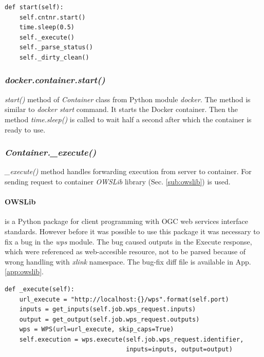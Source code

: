 


\begin{lstlisting}[basicstyle=\small,caption={\textit{Container.create()} method},label={lst:Container_start}]
def start(self):
    self.cntnr.start()
    time.sleep(0.5)
    self._execute()
    self._parse_status()
    self._dirty_clean()
\end{lstlisting}

\subsubsection{\textit{docker.container.start()}}
\textit{start()} method of \textit{Container} class from Python module \textit{docker}. The method is similar to \textit{docker start} command. 
It starts the Docker container. Then the method \textit{time.sleep()} is called to wait half a second after which the container is ready to 
use.

\subsubsection{\textit{Container.\_execute()}}
\label{sub:Container_execute}
\textit{\_execute()} method handles forwarding execution from server
to container. For sending request to container \textit{OWSLib}
library (Sec. \ref{sub:owslib}) is used.

\paragraph{OWSLib} is a Python package for client programming with OGC web services interface standards. However before it was possible
to use this package it was necessary to fix a bug in the \textit{wps} module. The bug caused outputs in the Execute response, which
were referenced as web-accesible resource, not to be parsed because of wrong handling with \textit{xlink} namespace. The bug-fix diff file 
is available in App. \ref{app:owslib}. 

\begin{lstlisting}[basicstyle=\small,caption={\textit{Container.\_execute()} method},label={lst:Container._execute}]
def _execute(self):
    url_execute = "http://localhost:{}/wps".format(self.port)
    inputs = get_inputs(self.job.wps_request.inputs)
    output = get_output(self.job.wps_request.outputs)
    wps = WPS(url=url_execute, skip_caps=True)
    self.execution = wps.execute(self.job.wps_request.identifier,
                                 inputs=inputs, output=output)
\end{lstlisting}

